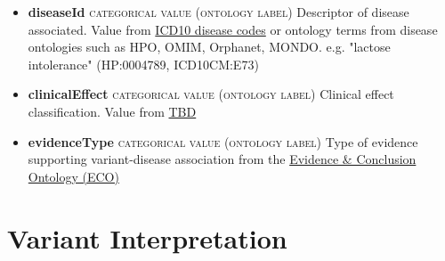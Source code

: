 \documentclass[a4paper, 10pt]{article}        %
\begin{document}
\begin{description}
	\begin{itemize}
				\item[] \textbf{diseaseId} {\textsc{categorical value (ontology label)}} Descriptor of disease associated. Value from \href{https://www.who.int/classifications/icd/en/}{ICD10 disease codes} or ontology terms from disease ontologies such as HPO, OMIM, Orphanet, MONDO. e.g. "lactose intolerance" (HP:0004789, ICD10CM:E73)
				\item[]  \textbf{clinicalEffect} {\textsc{categorical value (ontology label)}} Clinical effect classification. Value from \href{}{TBD}
				\item[]  \textbf{evidenceType} {\textsc{categorical value (ontology label)}} Type of evidence supporting variant-disease association from the \href{http://purl.obolibrary.org/obo/eco.owl}{Evidence \& Conclusion Ontology (ECO)}
	\end{itemize} 
 \end{description}
 
 
 
    	
\section*{ {\color{teal} Variant Interpretation}}
  
\end{document}
